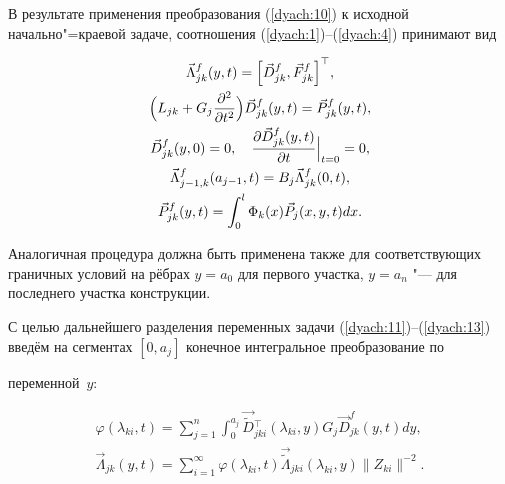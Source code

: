 


В результате применения преобразования (\ref{dyach:10}) к исходной начально"=краевой задаче, соотношения (\ref{dyach:1})--(\ref{dyach:4}) принимают вид

\begin{gather}

\notag

\vec{\Lambda}^f_{jk}(y,t)=\Bigl[\vec{D}^f_{jk},\vec{F}^f_{jk}\Bigr]^\top,\\

\label{dyach:11}

\Bigl(L_{jk} + G_j\frac{\partial ^2}{\partial t^2}\Bigr) \vec{D}^f_{jk}(y,t) = \vec{P}^f_{jk}(y,t),\\

\label{dyach:12}

\vec{D}^f_{jk}(y,0)= 0,\quad \frac{\partial\vec{D}^f_{jk}(y,t)}{\partial t}\Big|_{t=0}=0,\\

\label{dyach:13}

\vec{\Lambda}^f_{j-1,k}(a_{j-1},t)=B_j\vec{\Lambda}^f_{jk}(0,t),\\

\notag

\vec{P}^f_{jk}(y,t)=\int_{0}^{l}\Phi_k(x)\vec{P}_{j}(x,y,t)dx.

\end{gather}



Аналогичная процедура должна быть применена также для соответствующих граничных условий на рёбрах $y=a_0$ для первого участка, $y=a_n$ "--- для последнего участка конструкции.



С целью дальнейшего разделения переменных задачи (\ref{dyach:11})--(\ref{dyach:13}) введём на сегментах $[0, a_j]$ конечное интегральное преобразование по

переменной~$y$:

\begin{gather}

\label{dyach:14}

\varphi(\lambda_{ki},t) =\sum\limits_{j=1}^n \int_{0}^{a_j}\vec{\widetilde{D}}{}_{jki}^\top(\lambda_{ki},y) G_j \vec{D}^f_{jk}(y,t) dy,\\

\label{dyach:15}

\vec{\Lambda}_{jk}(y,t)=\sum\limits_{i=1}^\infty \varphi(\lambda_{ki},t)\vec{\widetilde{\Lambda}}_{jki}(\lambda_{ki},y) \|Z_{ki} \|^{-2}.

\end{gather}

